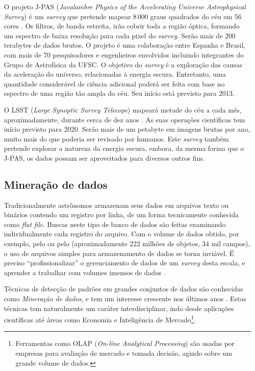 O projeto J-PAS ({\em Javalambre Physics of the Accelerating Universe
Astrophysical Survey}) é um {\em survey} que pretende mapear $8\,000$ graus
quadrados do céu em 56 cores \citep{Benitez2009}. Os filtros, de banda estreita,
irão cobrir toda a região óptica, formando um espectro de baixa resolução para
cada pixel do {\em survey}. Serão mais de 200 terabytes de dados brutos\citneed.
O projeto é uma colaboração entre Espanha e Brasil, com mais de 70 pesquisadores
e engenheiros envolvidos incluindo integrantes do Grupo de Astrofísica da UFSC.
O objetivo do {\em survey} é a exploração das causas da aceleração do universo,
relacionadas à energia escura. Entretanto, uma quantidade considerável de
ciência adicional poderá ser feita com base no espectro de uma região tão ampla
do céu. Seu início está previsto para 2013.

O LSST ({\em Large Synoptic Survey Telecope}) mapeará metade do céu a cada mês,
aproximadamente, durante cerca de dez anos \citep{Ivezic2008}. As suas operações
científicas tem início previsto para 2020. Serão mais de um petabyte em imagens
brutas por ano, muito mais do que poderia ser revisado por humanos. Este {\em
survey} também pretende explorar a natureza da energia escura, embora, da mesma
forma que o J-PAS, os dados possam ser aproveitados para diversos outros fins.

\subsection{Mineração de dados}

Tradicionalmente astrônomos armazenam seus dados em arquivos texto ou binários
contendo um registro por linha, de um forma tecnicamente conhecida como {\em
flat file}. Buscas neste tipo de banco de dados são feitas examinando
individualmente cada registro do arquivo. Com o volume de dados obtido, por
exemplo, pelo \SDSS ou pelo \galex (aproximadamente 222 milhões de objetos, 34
mil campos), o uso de arquivos simples para armazenamento de dados se torna
inviável. É preciso ``profissionalizar'' o gerenciamento de dados de um {\em
survey} desta escala, e aprender a trabalhar com volumes imensos de dados
\citep{Bell2006}.

Técnicas de detecção de padrões em grandes conjuntos de dados são conhecidas
como {\em Mineração de dados}, e tem um interesse crescente nos últimos anos
\citep{SIGKDD2011}. Estas técnicas tem naturalmente um caráter interdisciplinar,
indo desde aplicações científicas até áreas como Economia \citep{Spanos2000} e
Inteligência de Mercado\footnote{Ferramentas como OLAP ({\em On-line Analytical
Processing}) são usadas por empresas para avaliação de mercado e tomada decisão,
agindo sobre um grande volume de dados.}.

